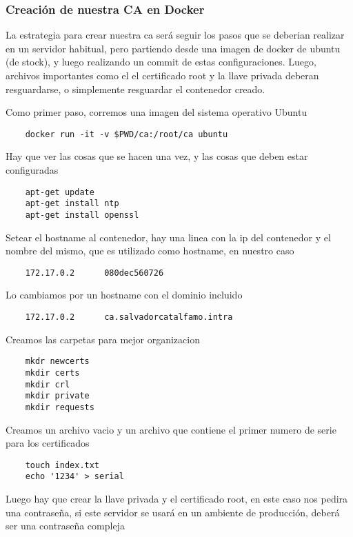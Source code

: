 \subsubsection*{Creación de nuestra CA en Docker}

La estrategia para crear nuestra ca será seguir los pasos que se deberian realizar en un servidor 
habitual, pero partiendo desde una imagen de docker de ubuntu (de stock), y luego realizando un 
commit de estas configuraciones. Luego, archivos importantes como el el certificado root y la llave
privada deberan resguardarse, o simplemente resguardar el contenedor creado. 

\noindent Como primer paso, corremos una imagen del sistema operativo Ubuntu

\begin{verbatim}
    docker run -it -v $PWD/ca:/root/ca ubuntu
\end{verbatim}

\noindent Hay que ver las cosas que se hacen una vez, y las cosas que deben estar configuradas

\begin{verbatim}
    apt-get update
    apt-get install ntp
    apt-get install openssl
\end{verbatim}

\noindent Setear el hostname al contenedor, hay una linea con la ip del contenedor y el nombre del mismo, 
que es utilizado como hostname, en nuestro caso
\begin{verbatim}
    172.17.0.2      080dec560726
\end{verbatim}

\noindent Lo cambiamos por un hostname con el dominio incluido
\begin{verbatim}
    172.17.0.2      ca.salvadorcatalfamo.intra
\end{verbatim}

\noindent Creamos las carpetas para mejor organizacion
\begin{verbatim}
    mkdr newcerts
    mkdir certs
    mkdir crl
    mkdir private
    mkdir requests
\end{verbatim}

\noindent Creamos un archivo vacio y un archivo que contiene el primer numero de serie para los certificados 
\begin{verbatim}
    touch index.txt
    echo '1234' > serial
\end{verbatim}

\noindent Luego hay que crear la llave privada y el certificado root, en este caso nos pedira una contraseña, si este servidor se usará en un ambiente de producción, deberá ser una contraseña compleja

